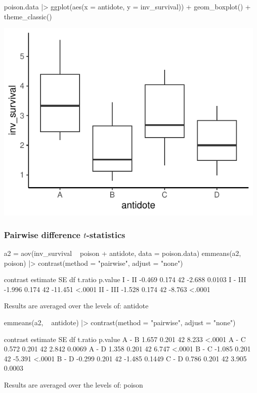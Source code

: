 \documentclass[a4paper]{article}\usepackage[]{graphicx}\usepackage[]{xcolor}
\makeatletter
\def\maxwidth{ %
  \ifdim\Gin@nat@width>\linewidth
    \linewidth
  \else
    \Gin@nat@width
  \fi
}
\makeatother
\begin{document}
\begin{minipage}[t]{0.49\textwidth}
\begin{Schunk}
\begin{Sinput}
poison.data |> 
  ggplot(aes(x = antidote, y = inv_survival)) +
  geom_boxplot() +
  theme_classic()
\end{Sinput}


{\centering \includegraphics[width=\maxwidth]{figure/listings-unnamed-chunk-327-1} 

}

\end{Schunk}
\end{minipage}
\subsubsection{Pairwise difference \( t \)-statistics}
\begin{Schunk}
\begin{Sinput}
a2 = aov(inv_survival ~ poison + antidote, data = poison.data)
emmeans(a2, ~ poison) |> contrast(method = "pairwise", adjust = "none")
\end{Sinput}
\begin{Soutput}
 contrast estimate    SE df t.ratio p.value
 I - II     -0.469 0.174 42  -2.688  0.0103
 I - III    -1.996 0.174 42 -11.451  <.0001
 II - III   -1.528 0.174 42  -8.763  <.0001

Results are averaged over the levels of: antidote 
\end{Soutput}
\begin{Sinput}
emmeans(a2, ~ antidote) |> contrast(method = "pairwise", adjust = "none")
\end{Sinput}
\begin{Soutput}
 contrast estimate    SE df t.ratio p.value
 A - B       1.657 0.201 42   8.233  <.0001
 A - C       0.572 0.201 42   2.842  0.0069
 A - D       1.358 0.201 42   6.747  <.0001
 B - C      -1.085 0.201 42  -5.391  <.0001
 B - D      -0.299 0.201 42  -1.485  0.1449
 C - D       0.786 0.201 42   3.905  0.0003

Results are averaged over the levels of: poison 
\end{Soutput}
\end{Schunk}
\end{document}
